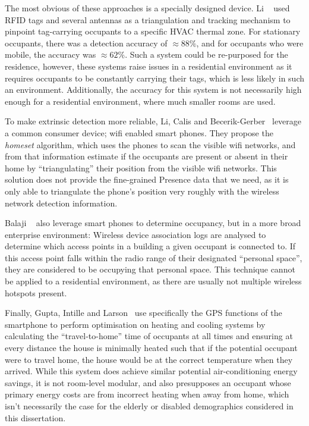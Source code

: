 \documentclass[../thesis/thesis.tex]{subfiles}
\begin{document}
The most obvious of these approaches is a specially designed device. Li \etal~\cite{li2012measuring} used RFID tags and several antennas as a triangulation and tracking mechanism to pinpoint tag-carrying occupants to a specific HVAC thermal zone. For stationary occupants, there was a detection accuracy of $\approx88\%$, and for occupants who were mobile, the accuracy was $\approx62\%$. Such a system could be re-purposed for the residence, however, these systems raise issues in a residential environment as it requires occupants to be constantly carrying their tags, which is less likely in such an environment. Additionally, the accuracy for this system is not necessarily high enough for a residential environment, where much smaller rooms are used.

To make extrinsic detection more reliable, Li, Calis and Becerik-Gerber~\cite{kleiminger2013inferring} leverage a common consumer device; wifi enabled smart phones. They propose the \textit{homeset} algorithm, which uses the phones to scan the visible wifi networks, and from that information estimate if the occupants are present or absent in their home by ``triangulating'' their position from the visible wifi networks. This solution does not provide the fine-grained Presence data that we need, as it is only able to triangulate the phone's position very roughly with the wireless network detection information.

Balaji \etal~\cite{balaji2013sentinel} also leverage smart phones to determine occupancy, but in a more broad enterprise environment: Wireless device association logs are analysed to determine which access points in a building a given occupant is connected to. If this access point falls within the radio range of their designated ``personal space'', they are considered to be occupying that personal space. This technique cannot be applied to a residential environment, as there are usually not multiple wireless hotspots present.

Finally, Gupta, Intille and Larson~\cite{gupta2009adding} use specifically the GPS functions of the smartphone to perform optimisation on heating and cooling systems by calculating the ``travel-to-home'' time of occupants at all times and ensuring at every distance the house is minimally heated such that if the potential occupant were to travel home, the house would be at the correct temperature when they arrived. While this system does achieve similar potential air-conditioning energy savings, it is not room-level modular, and also presupposes an occupant whose primary energy costs are from incorrect heating when away from home, which isn't necessarily the case for the elderly or disabled demographics considered in this dissertation.
\end{document}

